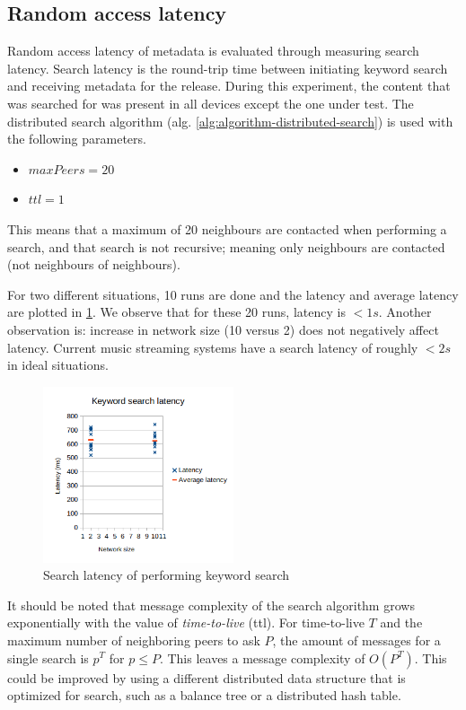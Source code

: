 \subsection{Random access latency}
Random access latency of metadata is evaluated through measuring search latency. Search latency is the round-trip time between initiating keyword search and receiving metadata for the release. During this experiment, the content that was searched for was present in all devices except the one under test. The distributed search algorithm (alg. \ref{alg:algorithm-distributed-search}) is used with the following parameters.
\begin{itemize}
    \item $maxPeers=20$
    \item $ttl=1$ 
\end{itemize}
This means that a maximum of 20 neighbours are contacted when performing a search, and that search is not recursive; meaning only neighbours are contacted (not neighbours of neighbours).

For two different situations, 10 runs are done and the latency and average latency are plotted in \ref{fig:search-latency}. We observe that for these 20 runs, latency is $<1s$. Another observation is: increase in network size (10 versus 2) does not negatively affect latency. Current music streaming systems have a search latency of roughly $<2s$ in ideal situations.

\begin{figure}
    \centering
    \includegraphics[width=0.5\textwidth]{evaluation/search-latency.png}
    \caption{Search latency of performing keyword search}
    \label{fig:search-latency}
\end{figure}

It should be noted that message complexity of the search algorithm grows exponentially with the value of \textit{time-to-live} (ttl). For time-to-live $T$ and the maximum number of neighboring peers to ask $P$, the amount of messages for a single search is $p^T$ for $p\leq P$. This leaves a message complexity of $O(P^T)$. This could be improved by using a different distributed data structure that is optimized for search, such as a balance tree or a distributed hash table. 

